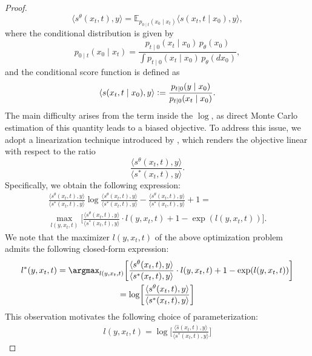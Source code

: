 \begin{proof}
            \begin{equation}
            \label{eq: conditional posterior expectation of score function}
                \langle s^{\theta}(x_t, t), y\rangle = \mathbb{E}_{p_{0 \mid t}(x_0 \mid x_t)} \langle s(x_t, t\mid x_0), y \rangle,
            \end{equation}
            where the conditional distribution is given by $$ p_{0 \mid t}(x_0 \mid x_t) = \frac{p_{t \mid 0}(x_t \mid x_0)\, p_{\theta}(x_0)} {\int p_{t \mid 0}(x_t \mid x_0)\, p_{\theta}(dx_0)},$$ and the conditional score function is defined as
            $$\langle s(x_t, t\mid x_0), y \rangle \vcentcolon= \frac{p_{t\mid 0} (y \mid x_0)}{p_{t\mid 0} (x_t \mid x_0)}.$$ The main difficulty arises from the term inside the $\log$, as direct Monte Carlo estimation of this quantity leads to a biased objective. To address this issue, we adopt a linearization technique introduced by \citet{kornilov2025universal}, which renders the objective linear with respect to the ratio $$ \frac{\langle s^{\theta}(x_t, t), y \rangle}{\langle s^{*}(x_t, t), y \rangle}. $$ Specifically, we obtain the following expression:
            \begin{gather}
                \frac{\langle s^{\theta}(x_t,t), y\rangle}{\langle s^{*}(x_t,t), y\rangle} \log \frac{\langle s^{\theta}(x_t,t), y\rangle}{\langle s^{*}(x_t,t), y\rangle} -  \frac{\langle s^{\theta}(x_t,t), y\rangle}{\langle s^{*}(x_t,t), y\rangle}  + 1 = \nonumber \\ \max_{l(y, x_t, t)} \biggl[\frac{\langle s^{\theta}(x_t,t), y\rangle}{\langle s^{*}(x_t,t), y\rangle} \cdot l(y, x_t, t) + 1 - \exp(l(y, x_t, t))\biggr]. \nonumber
            \end{gather}
            We note that the maximizer $l(y, x_t, t)$ of the above optimization problem admits the following closed-form expression:
            \begin{gather}
                l^*(y, x_t, t) = \argmax_{l(y, x_t, t)} \biggl[\frac{\langle s^{\theta}(x_t,t), y\rangle}{\langle s^{*}(x_t,t), y\rangle} \cdot l(y, x_t, t) + 1 - \exp(l(y, x_t, t))\biggr] \nonumber \\ = \log \biggl[ \frac{\langle s^{\theta}(x_t,t), y\rangle}{\langle s^{*}(x_t,t), y\rangle} \biggr]
            \end{gather}
            This observation motivates the following choice of parameterization:
            \begin{gather}
                l(y, x_t, t) = \log \biggl[ \frac{\langle \widehat{s}(x_t,t), y\rangle}{\langle s^{*}(x_t,t), y\rangle} \biggr]

\end{gather}
\end{proof}
